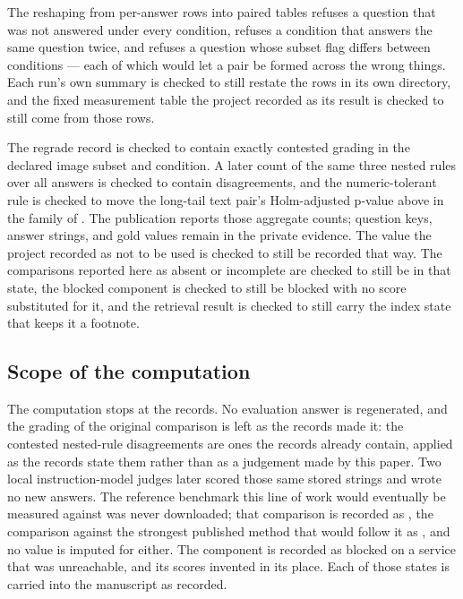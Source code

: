 The reshaping from per-answer rows into paired tables refuses a question that
was not answered under every condition, refuses a condition that answers the
same question twice, and refuses a question whose subset flag differs between
conditions --- each of which would let a pair be formed across the wrong things.
Each run's own summary is checked to still restate the rows in its own
directory, and the fixed measurement table the project recorded as its result is
checked to still come from those rows.

The regrade record is checked to contain exactly \RegradeImageFlip{} contested grading in the
declared image subset and condition. A later count of the same three nested
rules over all \Answers{} answers is checked to contain \RegradeContested{}
disagreements, and the numeric-tolerant rule is checked to move the long-tail
text pair's Holm-adjusted p-value above \AlphaLevel{} in the family of
\Contrasts{}. The publication reports those aggregate counts; question keys,
answer strings, and gold values remain in the private evidence. The value the project recorded as not to be used is checked to still
be recorded that way. The comparisons reported here as absent or incomplete are
checked to still be in that state, the blocked component is checked to still be
blocked with no score substituted for it, and the retrieval result is checked to
still carry the index state that keeps it a footnote.

\subsection{Scope of the computation}

The computation stops at the records. No evaluation answer is regenerated, and
the grading of the original comparison is left as the records made it: the
contested nested-rule disagreements are ones the records already contain,
applied as the records state them rather than as a judgement made by this
paper. Two local instruction-model judges later scored those same stored
strings and wrote no new answers. The reference benchmark this line of work
would eventually be measured against was never downloaded; that comparison is
recorded as \PrimaryTier{}, the comparison against the strongest published
method that would follow it as \SotaTier{}, and no value is imputed for either.
The \BlockedComponent{} component is recorded as blocked on a service that was
unreachable, and its scores \ForgedState{} invented in its place. Each of those
states is carried into the manuscript as recorded.

